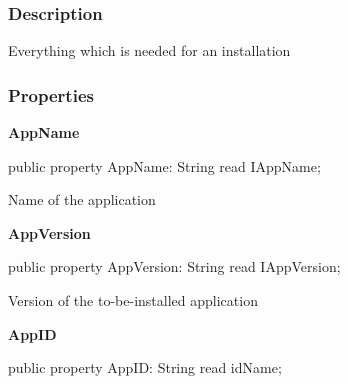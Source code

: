 \documentclass{report}
\newif\ifpdf
\begin{document}
\subsubsection*{\large{\textbf{Description}}\normalsize\hspace{1ex}\hfill}
Everything which is needed for an installation\subsubsection*{\large{\textbf{Properties}}\normalsize\hspace{1ex}\hfill}
\begin{list}{}{
\setlength{\itemindent}{0cm}
\setlength{\listparindent}{0cm}
\setlength{\leftmargin}{\evensidemargin}
\addtolength{\leftmargin}{\tmplength}
\settowidth{\labelsep}{X}
\addtolength{\leftmargin}{\labelsep}
\setlength{\labelwidth}{\tmplength}
}
\label{ipkhandle.TInstallation-AppName}
\item[\textbf{AppName}\hfill]
\ifpdf
\begin{flushleft}
\fi
\begin{ttfamily}
public property AppName: String read IAppName;\end{ttfamily}

\ifpdf
\end{flushleft}
\fi


\par Name of the application\label{ipkhandle.TInstallation-AppVersion}
\item[\textbf{AppVersion}\hfill]
\ifpdf
\begin{flushleft}
\fi
\begin{ttfamily}
public property AppVersion: String read IAppVersion;\end{ttfamily}

\ifpdf
\end{flushleft}
\fi


\par Version of the to{-}be{-}installed application\label{ipkhandle.TInstallation-AppID}
\item[\textbf{AppID}\hfill]
\ifpdf
\begin{flushleft}
\fi
\begin{ttfamily}
public property AppID: String read idName;\end{ttfamily}

\ifpdf
\end{flushleft}
\fi



\end{list}
\end{document}
